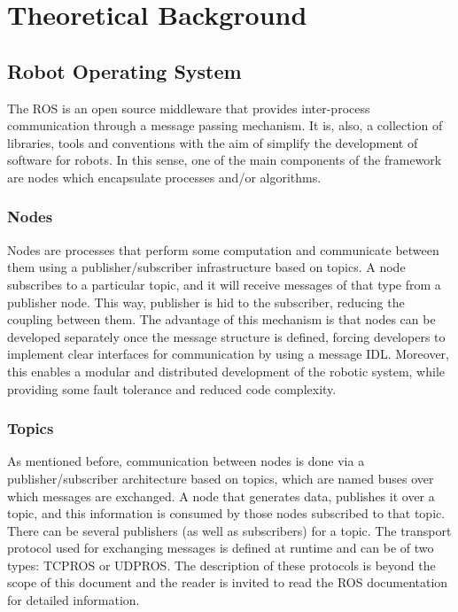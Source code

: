 \chapter{Theoretical Background}
\label{ch:chapter1}

\section{Robot Operating System}
\label{sec:chapter1:ros}
The \ac{ROS} \nocite{ros-website} is an open source middleware that provides inter-process communication through a message passing mechanism. It is, also, a collection of libraries, tools and conventions with the aim of simplify the development of software for robots. In this sense, one of the main components of the framework are nodes which encapsulate processes and/or algorithms.

\subsection{Nodes}
\label{subsec:chapter1:ros:nodes}
Nodes are processes that perform some computation and communicate between them using a publisher/subscriber infrastructure based on topics. A node subscribes to a particular topic, and it will receive messages of that type from a publisher node. This way, publisher is hid to the subscriber, reducing the coupling between them. The advantage of this mechanism is that nodes can be developed separately once the message structure is defined, forcing developers to implement clear interfaces for communication by using a message \ac{IDL}. Moreover, this enables a modular and distributed development of the robotic system, while providing some fault tolerance and reduced code complexity.

\subsection{Topics}
\label{subsec:chapter1:ros:topics}
As mentioned before, communication between nodes is done via a publisher/subscriber architecture based on topics, which are named buses over which messages are exchanged. A node that generates data, publishes it over a topic, and this information is consumed by those nodes subscribed to that topic. There can be several publishers (as well as subscribers) for a topic. The transport protocol used for exchanging messages is defined at runtime and can be of two types: TCPROS or UDPROS. The description of these protocols is beyond the scope of this document and the reader is invited to read the ROS documentation for detailed information.

